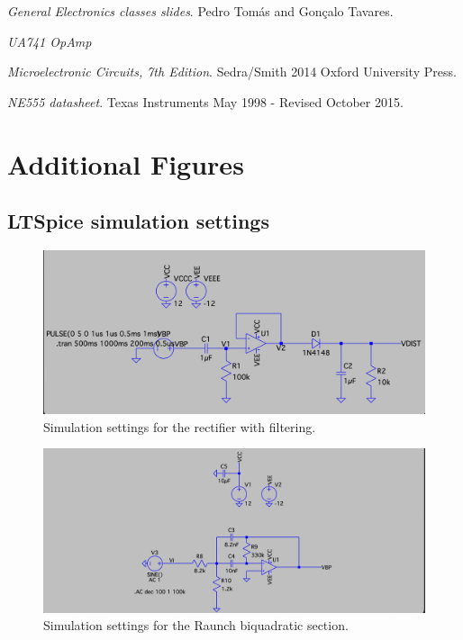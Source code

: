 \documentclass[lettersize,journal]{IEEEtran}
\begin{document}
\begin{thebibliography}{1}


{\it{General Electronics} classes slides}. Pedro Tomás and Gonçalo Tavares.

{\it{UA741 OpAmp}}

{\it{Microelectronic Circuits, 7th Edition}}. Sedra/Smith 2014 Oxford University Press.

{\it{NE555 datasheet}}.
Texas Instruments May 1998 - Revised October 2015.

\end{thebibliography}

\clearpage
\appendices

\section{Additional Figures}
\subsection{LTSpice simulation settings}
\label{appendix:ltspice_settings}

\begin{figure}[H]
    \centering
    \includegraphics[width=\linewidth]{images/anexos/ltspice/week1_sim.png}
    \caption{Simulation settings for the rectifier with filtering.}
    \label{fig:ltspice_sim_settings_week1}
\end{figure}

\begin{figure}[H]
    \centering
    \includegraphics[width=\linewidth]{images/anexos/ltspice/week2_sim.png}
    \caption{Simulation settings for the Raunch biquadratic section.}
    \label{fig:ltspice_sim_settings_week2}
\end{figure}
\end{document}
